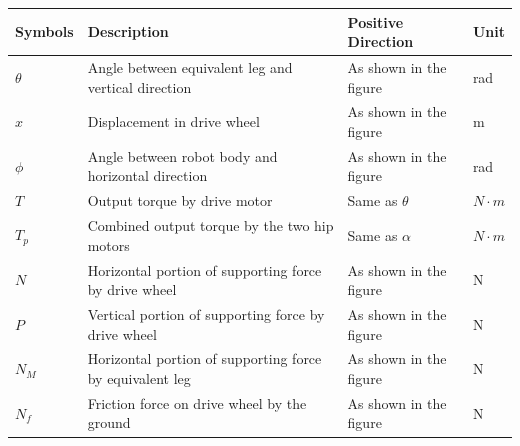 \documentclass[12pt]{article}
\begin{document}
            \begin{table}[H]
                \begin{tabular}{|p{}|p{}|p{}|p{}|}
            
                    \hline Symbols   & Description & Positive Direction     & Unit        \\
                    \hline $ \theta$ & Angle between equivalent leg and vertical direction                            & As shown in the figure & rad         \\
                    \hline $ x     $ & Displacement in drive wheel                                                    & As shown in the figure & m           \\
                    \hline $ \phi  $ & Angle between robot body and horizontal direction                              & As shown in the figure & rad         \\
                    \hline $ T     $ & Output torque by drive motor                                                   & Same as $\theta$         & $N \cdot m$         \\
                    \hline $ T_p   $ & Combined output torque by the two hip motors                                   & Same as $\alpha$         & $N \cdot m$         \\
                    \hline $ N        $ & Horizontal portion of supporting force by drive wheel                          & As shown in the figure & N           \\
                    \hline $ P        $ & Vertical portion of supporting force by drive wheel                            & As shown in the figure & N           \\
                    \hline $ N_M      $ & Horizontal portion of supporting force by equivalent leg                       & As shown in the figure & N           \\
                    \hline $ N_f      $ & Friction force on drive wheel by the ground                                    & As shown in the figure & N           \\
            

\end{tabular}
\end{table}
\end{document}

